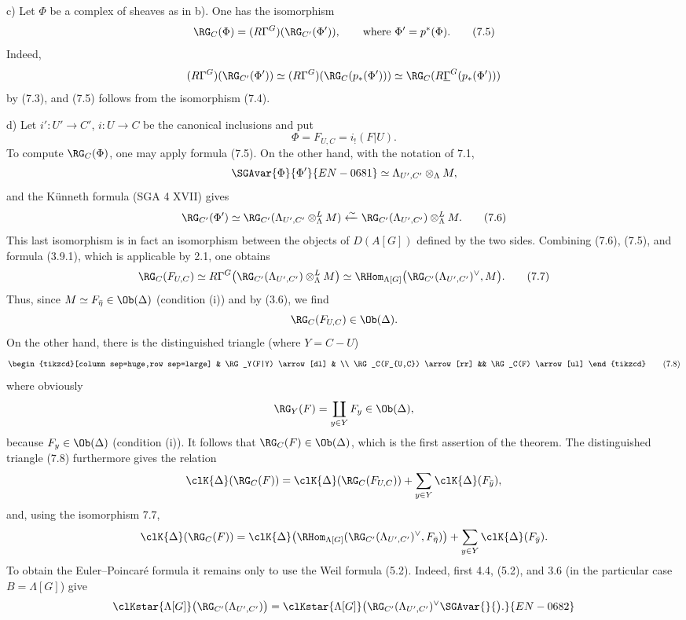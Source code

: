 c) Let $\Phi$ be a complex of sheaves as in b). One has the isomorphism
\[
\RG_C(\Phi)=(R\Gamma^G)(\RG_{C'}(\Phi')),
\qquad\text{where } \Phi'=p^*(\Phi).
\tag{7.5}
\]
Indeed,
\[
(R\Gamma^G)(\RG_{C'}(\Phi'))
\simeq
(R\Gamma^G)(\RG_C(p_*(\Phi')))
\simeq
\RG_C(R\underline{\Gamma}^G(p_*(\Phi')))
\]
by (7.3), and (7.5) follows from the isomorphism (7.4).

d) Let $i':U'\to C'$, $i:U\to C$ be the canonical inclusions and put
\[
\Phi=F_{U,C}=i_!(F|U).
\]
To compute $\RG_C(\Phi)$, one may apply formula (7.5). On the other hand, with the notation of 7.1,
\[
\SGAvar{\Phi}{\Phi'}{EN-0681}\simeq \Lambda_{U',C'}\otimes_\Lambda M,
\]
and the Künneth formula (SGA 4 XVII) gives
\[
\RG_{C'}(\Phi')
\simeq
\RG_{C'}(\Lambda_{U',C'}\otimes_\Lambda^L M)
\xleftarrow{\sim}
\RG_{C'}(\Lambda_{U',C'})\otimes_\Lambda^L M.
\tag{7.6}
\]
This last isomorphism is in fact an isomorphism between the objects of $D(A[G])$ defined by the two sides. Combining (7.6), (7.5), and formula (3.9.1), which is applicable by 2.1, one obtains
\[
\RG_C(F_{U,C})
\simeq
R\Gamma^G\bigl(\RG_{C'}(\Lambda_{U',C'})\otimes_\Lambda^L M\bigr)
\simeq
\RHom_{\Lambda[G]}\bigl(\RG_{C'}(\Lambda_{U',C'})^\vee,M\bigr).
\tag{7.7}
\]
Thus, since $M\simeq F_{\bar\eta}\in\Ob(\Delta)$ (condition (i)) and by (3.6), we find
\[
\RG_C(F_{U,C})\in\Ob(\Delta).
\]
On the other hand, there is the distinguished triangle (where $Y=C-U$)
\[
\begin{tikzcd}[column sep=huge,row sep=large]
& \RG_Y(F|Y) \arrow[dl] & \\
\RG_C(F_{U,C}) \arrow[rr] && \RG_C(F) \arrow[ul]
\end{tikzcd}
\tag{7.8}
\]
where obviously
\[
\RG_Y(F)=\coprod_{y\in Y}F_y\in\Ob(\Delta),
\]
because $F_y\in\Ob(\Delta)$ (condition (i)). It follows that $\RG_C(F)\in\Ob(\Delta)$, which is the first assertion of the theorem. The distinguished triangle (7.8) furthermore gives the relation
\[
\clK{\Delta}(\RG_C(F))
=
\clK{\Delta}(\RG_C(F_{U,C}))
+\sum_{y\in Y}\clK{\Delta}(F_{\bar y}),
\]
and, using the isomorphism 7.7,
\[
\clK{\Delta}(\RG_C(F))
=
\clK{\Delta}\bigl(\RHom_{\Lambda[G]}(\RG_{C'}(\Lambda_{U',C'})^\vee,F_{\bar\eta})\bigr)
+\sum_{y\in Y}\clK{\Delta}(F_{\bar y}).
\]
To obtain the Euler--Poincaré formula it remains only to use the Weil formula (5.2). Indeed, first 4.4, (5.2), and 3.6 (in the particular case %
$B=\Lambda[G]$) give
\[
\clKstar{\Lambda[G]}\bigl(\RG_{C'}(\Lambda_{U',C'})\bigr)
=
\clKstar{\Lambda[G]}\bigl(\RG_{C'}(\Lambda_{U',C'})^\vee\SGAvar{\bigr.}{\bigr).}{EN-0682}
\]
